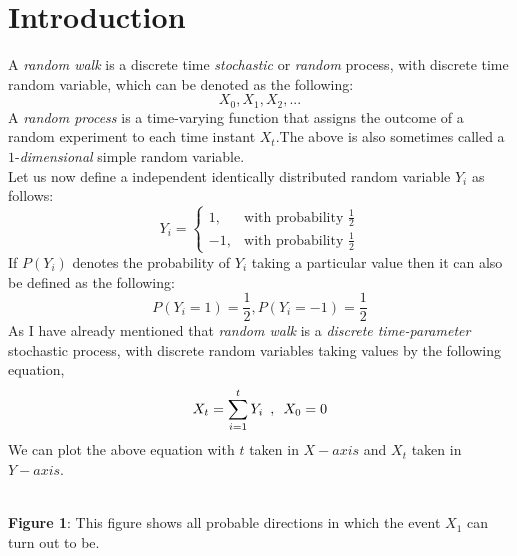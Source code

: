 \documentclass[12pt,a4paper]{article}%
\begin{document}
	\pagebreak
	\tableofcontents
	\cleardoublepage
	\section{Introduction}\label{sec:intro}
	\begin{flushleft}
		A \textit{random walk} is a discrete time \textit{stochastic} or \textit{random} process, with discrete time random variable, which can be denoted as the following:
		\begin{equation}
			X_{0},X_{1},X_{2},...
		\end{equation}
		A \textit{random process} is a time-varying function that assigns the	outcome of a random experiment to each time instant $X_{t}$.The above is also sometimes called a $1$-\textit{dimensional} simple random variable.\\
		Let us now define a independent identically distributed random variable $Y_{i}$ as follows:
		\[
		Y_{i}= 
		\begin{cases}
		1,& \text{with probability } \frac{1}{2}\\
		-1,              & \text{with probability } \frac{1}{2}
		\end{cases}
		\]
		If $P(Y_{i})$ denotes the probability of $Y_{i}$ taking a particular value then it can also be defined as the following:
		\begin{equation}
			P(Y_{i}=1) = \dfrac{1}{2}, P(Y_{i}=-1) = \dfrac{1}{2}
		\end{equation}
		As I have already mentioned that \textit{random walk} is a \textit{discrete time-parameter} stochastic process, with discrete random variables taking values by the following equation,
		\begin{equation}
			X_{t} = \sum_{\mathclap{i=1}}^{t} Y_{i}\enspace , \enspace X_{0}=0
		\end{equation}
		We can plot the above equation with $t$ taken in $X-axis$ and $X_{t}$ taken in $Y-axis$.
	\end{flushleft}
	\begin{center}
		\\\textbf{Figure 1}: This figure shows all probable directions in which the event $X_{1}$ can turn out to be.
	\end{center}
		
\end{document}
